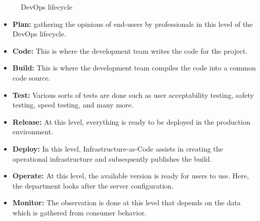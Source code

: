 \begin{figure}[H]
    \centering
    \caption{DevOps lifecycle}
    \label{fig:devops_lifecycle}
\end{figure}

\begin{itemize}
    \item \textbf{Plan:} gathering the opinions of end-users by professionals in this level of the DevOps lifecycle.
    \item \textbf{Code:} This is where the development team writes the code for the project.
    \item \textbf{Build:} This is where the development team compiles the code into a common code source.
    \item \textbf{Test:} Various sorts of tests are done such as user acceptability testing, safety testing, speed testing, and many more.
    \item \textbf{Release:} At this level, everything is ready to be deployed in the production environment.
    \item \textbf{Deploy:} In this level, Infrastructure-as-Code assists in creating the operational infrastructure and subsequently publishes the build.
    \item \textbf{Operate:} At this level, the available version is ready for users to use. Here, the department looks after the server configuration.
    \item \textbf{Monitor:} The observation is done at this level that depends on the data which is gathered from consumer behavior.
\end{itemize}

